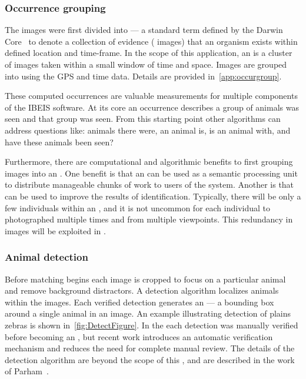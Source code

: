         \subsubsection{Occurrence grouping}
            The images were first divided into \glossterm{\occurrences{}} --- a standard term defined by the Darwin
            Core~\cite{wieczorek_darwin_2012} to denote a collection of evidence (\eg{} images) that an organism exists
            within defined location and time-frame. In the scope of this application, an \occurrence{} is a cluster of
            images taken within a small window of time and space. Images are grouped into \occurrences{} using the GPS
            and time data. Details are provided in~\cref{app:occurgroup}.

            These computed occurrences are valuable measurements for multiple components of the IBEIS software.
            At its core an occurrence describes  a group of animals was seen and  that
              group was seen.
            From this starting point other algorithms can address questions like:
             animals there were,  an animal is,  is an animal with,
              and  have these animals been seen?
            
            Furthermore, there are computational and algorithmic benefits to first grouping images into an
              \occurrence{}.
            One benefit is that an \occurrence{} can be used as a semantic processing unit to distribute
              manageable chunks of work to users of the system.
            Another is that \occurrences{} can be used to improve the results of identification.
            Typically, there will be only a few individuals within an \occurrence{}, and it is not uncommon for
              each individual to photographed multiple times and from multiple viewpoints.
            This redundancy in images will be exploited in .

        \subsubsection{Animal detection}
            Before matching begins each image is cropped to focus on a particular animal and remove background
              distractors.
            A detection algorithm localizes animals within the images.
            Each verified detection generates an \glossterm{\annot{}} --- a bounding box around a single animal
              in an image.
            An example illustrating detection of plains zebras is shown in~\cref{fig:DetectFigure}.
            In the \GZC{} each detection was manually verified before becoming an \annot{}, but recent work
              introduces an automatic verification mechanism and reduces the need for complete manual review.
            The details of the detection algorithm are beyond the scope of this \thesis{}, and are described in
              the work of Parham~\cite{parham_photographic_2015,parham_detecting_2016}.

